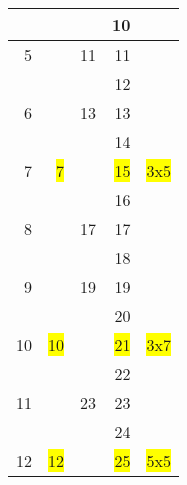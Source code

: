 \begin{tabular}{|r|r|r|r|r|}
\hline                              &                        &         &     10    &                                \\
\hline               5              &                        &    11   &     11    &                                \\
\hline                              &                        &         &     12    &                                \\
\hline               6              &                        &    13   &     13    &                                \\
\hline                              &                        &         &     14    &                                \\
\hline               7              &   \colorbox{yellow}{7} &         &     \colorbox{yellow}{15}    &     \colorbox{yellow}{3x5  }   \\
\hline                              &                        &         &     16    &                                \\
\hline               8              &                        &    17   &     17    &                                \\
\hline                              &                        &         &     18    &                                \\
\hline               9              &                        &    19   &     19    &                                \\
\hline                              &                        &         &     20    &                                \\
\hline               10             &   \colorbox{yellow}{10}&         &     \colorbox{yellow}{21}    &     \colorbox{yellow}{3x7  }   \\
\hline                              &                        &         &     22    &                                \\
\hline               11             &                        &    23   &     23    &                                \\
\hline                              &                        &         &     24    &                                \\
\hline               12             &   \colorbox{yellow}{12}&         &     \colorbox{yellow}{25}    &     \colorbox{yellow}{5x5  }   \\

\end{tabular}
